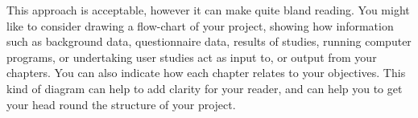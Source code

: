 This approach is acceptable, however it can make quite bland reading.  You might like to consider drawing a flow-chart of your project, showing how information such as background data, questionnaire data, results of studies, running computer programs, or undertaking user studies act as input to, or output from your chapters. You can also indicate how each chapter relates to your objectives.  This kind of diagram can help to add clarity for your reader, and can help you to get your head round the structure of your project.






